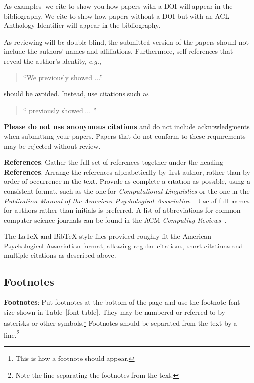 \documentclass[11pt,a4paper]{article}
\begin{document}
As examples, we cite \cite{P16-1001} to show you how papers with a DOI
will appear in the bibliography.  We cite \cite{C14-1001} to show how
papers without a DOI but with an ACL Anthology Identifier will appear
in the bibliography.

As reviewing will be double-blind, the submitted version of the papers
should not include the authors' names and affiliations. Furthermore,
self-references that reveal the author's identity, {\em e.g.},
\begin{quote}
``We previously showed \cite{Gusfield:97} ...''
\end{quote}
should be avoided. Instead, use citations such as
\begin{quote}
``\citeauthor{Gusfield:97} 
previously showed ... ''
\end{quote}

\textbf{Please do not use anonymous citations} and do not include
acknowledgments when submitting your papers. Papers that do not
conform to these requirements may be rejected without review.

\textbf{References}: Gather the full set of references together under
the heading \textbf{References}.
Arrange the references alphabetically
by first author, rather than by order of occurrence in the text.
Provide as complete a citation as possible, using a consistent format,
such as the one for {\em Computational Linguistics\/} or the one in the
{\em Publication Manual of the American
Psychological Association\/}~\cite{APA:83}.  Use of full names for
authors rather than initials is preferred.
A list of abbreviations for common computer science journals can be found in the ACM {\em Computing Reviews\/}~\cite{ACM:83}.

The \LaTeX{} and Bib\TeX{} style files provided roughly fit the
American Psychological Association format, allowing regular citations,
short citations and multiple citations as described above.

\subsection{Footnotes}

\textbf{Footnotes}: Put footnotes at the bottom of the page and use the footnote font size shown in Table~\ref{font-table}. They may be numbered or referred to by asterisks or other
symbols.\footnote{This is how a footnote should appear.} Footnotes
should be separated from the text by a line.\footnote{Note the line
separating the footnotes from the text.}
\end{document}
